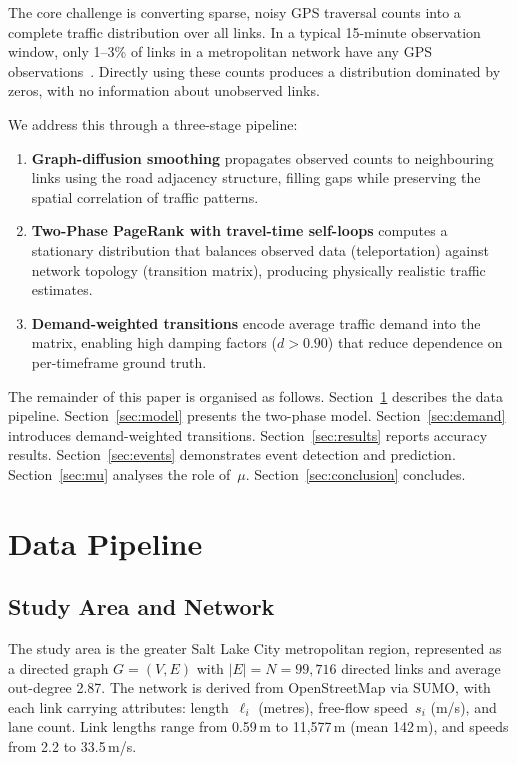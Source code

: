 \documentclass[11pt]{article}
\begin{document}
The core challenge is converting sparse, noisy GPS traversal counts into a complete traffic distribution over all links.
In a typical 15-minute observation window, only 1--3\% of links in a metropolitan network have any GPS observations~\cite{horvitz2012prediction}.
Directly using these counts produces a distribution dominated by zeros, with no information about unobserved links.

We address this through a three-stage pipeline:
\begin{enumerate}
    \item \textbf{Graph-diffusion smoothing} propagates observed counts to neighbouring links using the road adjacency structure, filling gaps while preserving the spatial correlation of traffic patterns.
    \item \textbf{Two-Phase PageRank with travel-time self-loops} computes a stationary distribution that balances observed data (teleportation) against network topology (transition matrix), producing physically realistic traffic estimates.
    \item \textbf{Demand-weighted transitions} encode average traffic demand into the matrix, enabling high damping factors ($d > 0.90$) that reduce dependence on per-timeframe ground truth.
\end{enumerate}

The remainder of this paper is organised as follows.
Section~\ref{sec:data} describes the data pipeline.
Section~\ref{sec:model} presents the two-phase model.
Section~\ref{sec:demand} introduces demand-weighted transitions.
Section~\ref{sec:results} reports accuracy results.
Section~\ref{sec:events} demonstrates event detection and prediction.
Section~\ref{sec:mu} analyses the role of~$\mu$.
Section~\ref{sec:conclusion} concludes.


\section{Data Pipeline}
\label{sec:data}

\subsection{Study Area and Network}

The study area is the greater Salt Lake City metropolitan region, represented as a directed graph $G = (V, E)$ with $|E| = N = 99{,}716$ directed links and average out-degree 2.87.
The network is derived from OpenStreetMap via SUMO, with each link carrying attributes: length~$\ell_i$ (metres), free-flow speed~$s_i$ (m/s), and lane count.
Link lengths range from 0.59\,m to 11,577\,m (mean 142\,m), and speeds from 2.2 to 33.5\,m/s.
\end{document}
